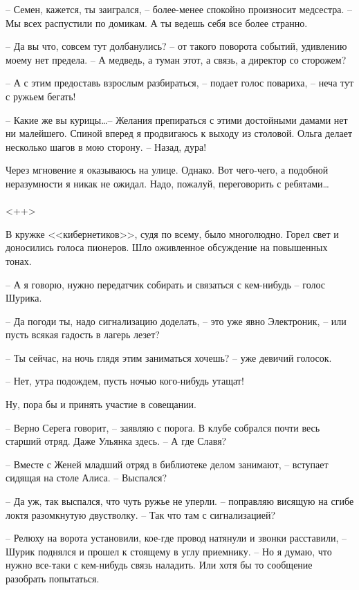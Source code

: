 \documentclass[a4paper]{book}
\begin{document}
-- Семен, кажется, ты заигрался, -- более-менее спокойно произносит медсестра. -- Мы всех распустили по домикам. А ты ведешь себя все более странно.

-- Да вы что, совсем тут долбанулись? -- от такого поворота событий, удивлению моему нет предела. -- А медведь, а туман этот, а связь, а директор со сторожем? 

-- А с этим предоставь взрослым разбираться, -- подает голос повариха, -- неча тут с ружьем бегать!

-- Какие же вы курицы\ldots -- Желания препираться с этими достойными дамами нет ни малейшего. Спиной вперед я продвигаюсь к выходу из столовой. Ольга делает несколько шагов в мою сторону. -- Назад, дура!

Через мгновение я оказываюсь на улице. Однако. Вот чего-чего, а подобной неразумности я никак не ожидал. Надо, пожалуй, переговорить с ребятами\ldots 

\paragraph{}<++>

В кружке <<кибернетиков>>, судя по всему, было многолюдно. Горел свет и доносились голоса пионеров. Шло оживленное обсуждение на повышенных тонах. 

-- А я говорю, нужно передатчик собирать и связаться с кем-нибудь -- голос Шурика. 

-- Да погоди ты, надо сигнализацию доделать, -- это уже явно Электроник, -- или пусть всякая гадость в лагерь лезет?

-- Ты сейчас, на ночь глядя этим заниматься хочешь? -- уже девичий голосок. 

-- Нет, утра подождем, пусть ночью кого-нибудь утащат!

Ну, пора бы и принять участие в совещании. 

-- Верно Серега говорит, -- заявляю с порога. В клубе собрался почти весь старший отряд. Даже Ульянка здесь. -- А где Славя?

-- Вместе с Женей младший отряд в библиотеке делом занимают, -- вступает сидящая на столе Алиса. -- Выспался? 

-- Да уж, так выспался, что чуть ружье не уперли. -- поправляю висящую на сгибе локтя разомкнутую двустволку. -- Так что там с сигнализацией?

-- Релюху на ворота установили, кое-где провод натянули и звонки расставили, -- Шурик поднялся и прошел к стоящему в углу приемнику. -- Но я думаю, что нужно все-таки с кем-нибудь связь наладить. Или хотя бы то сообщение разобрать попытаться. 
\end{document}
